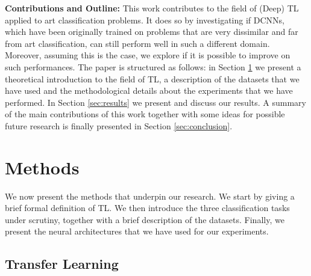\documentclass[runningheads]{llncs}
\begin{document}
\textbf{Contributions and Outline:} 
This work contributes to the field of (Deep) TL applied to art classification problems. It does so by investigating if DCNNs, which have been originally trained on problems that are very dissimilar and far from art classification, can still perform well in such a different domain. Moreover, assuming this is the case, we explore if it is possible to improve on such performances. The paper is structured as follows: in Section \ref{sec:methods} we present a theoretical introduction to the field of TL, a description of the datasets that we have used and the methodological details about the experiments that we have performed. In Section \ref{sec:results} we present and discuss our results. A summary of the main contributions of this work together with some ideas for possible future research is finally presented in Section \ref{sec:conclusion}.



\section{Methods}
\label{sec:methods}

We now present the methods that underpin our research. We start by giving a brief formal definition of TL. We then introduce the three classification tasks under scrutiny, together with a brief description of the datasets. Finally, we present the neural architectures that we have used for our experiments. 

\subsection{Transfer Learning}
\label{subsec: tl}
\end{document}
